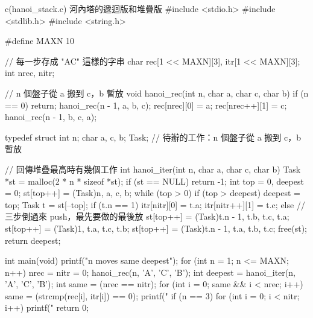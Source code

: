 \begin{example}[label=ex:sq-hanoi]{c}{(hanoi\_stack.c) 河內塔的遞迴版和堆疊版}
#include <stdio.h>
#include <stdlib.h>
#include <string.h>

#define MAXN 10

// 每一步存成 "AC" 這樣的字串
char rec[1 << MAXN][3], itr[1 << MAXN][3];
int nrec, nitr;

// n 個盤子從 a 搬到 c，b 暫放
void hanoi_rec(int n, char a, char c, char b)
{
    if (n == 0) {
        return;
    }
    hanoi_rec(n - 1, a, b, c);
    rec[nrec][0] = a;
    rec[nrec++][1] = c;
    hanoi_rec(n - 1, b, c, a);
}

typedef struct {
    int n;
    char a, c, b;
} Task;                     // 待辦的工作：n 個盤子從 a 搬到 c，b 暫放

// 回傳堆疊最高時有幾個工作
int hanoi_iter(int n, char a, char c, char b)
{
    Task *st = malloc(2 * n * sizeof *st);
    if (st == NULL) {
        return -1;
    }
    int top = 0, deepest = 0;
    st[top++] = (Task){n, a, c, b};
    while (top > 0) {
        if (top > deepest) {
            deepest = top;
        }
        Task t = st[--top];
        if (t.n == 1) {
            itr[nitr][0] = t.a;
            itr[nitr++][1] = t.c;
        } else {            // 三步倒過來 push，最先要做的最後放
            st[top++] = (Task){t.n - 1, t.b, t.c, t.a};
            st[top++] = (Task){1, t.a, t.c, t.b};
            st[top++] = (Task){t.n - 1, t.a, t.b, t.c};
        }
    }
    free(st);
    return deepest;
}

int main(void)
{
    printf("n moves same deepest\n");
    for (int n = 1; n <= MAXN; n++) {
        nrec = nitr = 0;
        hanoi_rec(n, 'A', 'C', 'B');
        int deepest = hanoi_iter(n, 'A', 'C', 'B');
        int same = (nrec == nitr);
        for (int i = 0; same && i < nrec; i++) {
            same = (strcmp(rec[i], itr[i]) == 0);
        }
        printf("%
        if (n == 3) {
            for (int i = 0; i < nitr; i++) {
                printf("%
            }
        }
    }
    return 0;
}
\end{example}

